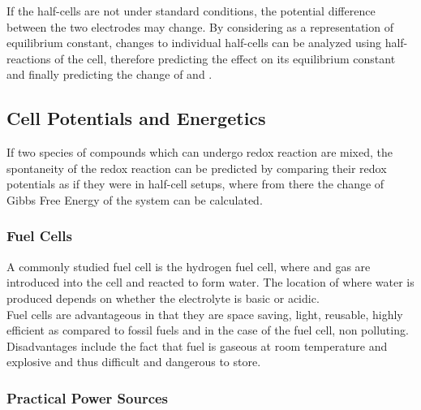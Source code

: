 \documentclass[../main]{subfiles}
\begin{document}
	If the half-cells are not under standard conditions, the potential difference between the two electrodes may change. By considering  as a representation of equilibrium constant, changes to individual half-cells can be analyzed using half-reactions of the cell, therefore predicting the effect on its equilibrium constant and finally predicting the change of  and . \\

	\subsection{Cell Potentials and Energetics}


	If two species of compounds which can undergo redox reaction are mixed, the spontaneity of the redox reaction can be predicted by comparing their redox potentials as if they were in half-cell setups, where from there the change of Gibbs Free Energy of the system can be calculated. \\

	\subsubsection{Fuel Cells}


	A commonly studied fuel cell is the hydrogen fuel cell, where  and  gas are introduced into the cell and reacted to form water. The location of where water is produced depends on whether the electrolyte is basic or acidic. \\

	Fuel cells are advantageous in that they are space saving, light, reusable, highly efficient as compared to fossil fuels and in the case of the  fuel cell, non polluting. Disadvantages include the fact that  fuel is gaseous at room temperature and explosive and thus difficult and dangerous to store. \\

	\subsubsection{Practical Power Sources}
\end{document}
